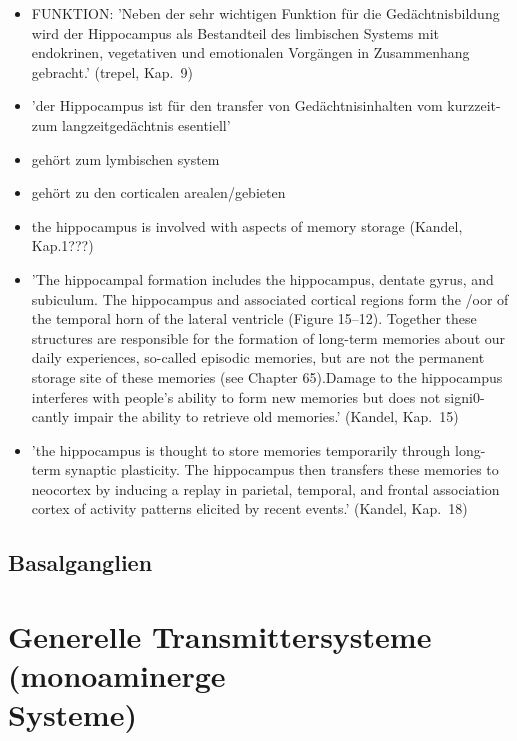 \documentclass[12pt,a4paper,pdftex]{article}
\begin{document}
\begin{itemize}
\item FUNKTION: 'Neben der sehr wichtigen Funktion für die Gedächtnisbildung wird der Hippocampus als Bestandteil des limbischen Systems mit endokrinen, vegetativen und emotionalen Vorgängen in Zusammenhang gebracht.' (trepel, Kap.~9)

\item 'der Hippocampus ist für den transfer von Gedächtnisinhalten vom kurzzeit- zum langzeitgedächtnis esentiell' \cite[Kap.~6]{storch2012lehrbuchzoo}

\item gehört zum lymbischen system \cite[Kap.~6]{storch2012lehrbuchzoo}

\item gehört zu den corticalen arealen/gebieten  \cite[Kap.~6]{storch2012lehrbuchzoo}

\item the hippocampus is involved with aspects of memory storage (Kandel, Kap.1???)

\item 'The hippocampal formation includes the hippocampus, dentate gyrus, and subiculum. The hippocampus and associated cortical regions form the /oor of the temporal horn of the lateral ventricle (Figure 15–12). Together these structures are responsible for the formation of long-term memories about our daily experiences, so-called episodic memories, but are not the permanent storage site of these memories (see Chapter 65).Damage to the hippocampus interferes with people’s ability to form new memories but does not signi0-cantly impair the ability to retrieve old memories.' (Kandel, Kap.~15)

\item 'the hippocampus is thought to store memories temporarily through long-term synaptic plasticity. The hippocampus then transfers these memories to neocortex by inducing a replay in parietal, temporal, and frontal association cortex of activity patterns elicited by recent events.' (Kandel, Kap.~18)

\end{itemize}

\subsection{Basalganglien}

\newpage
\section[Generelle Transmittersysteme (monoaminerge Systeme)]{Generelle Transmittersysteme (monoaminerge \\Systeme)}
\end{document}

